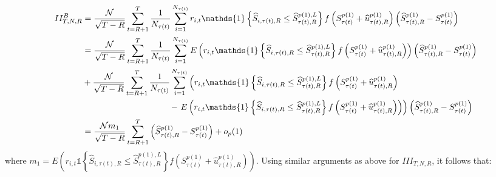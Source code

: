 \begin{align*}
    II_{T,N,R}^B &= \frac{\mathcal{N}}{\sqrt{T-R}}\sum_{t=R+1}^{T} \frac{1}{N_{\tau(t)}}\sum_{i=1}^{N_{\tau(t)}} r_{i,t} \mathds{1} \left\{ \widehat{S}_{i,\tau(t),R}\leq \widehat{S}_{\tau(t),R}^{p(1),L}\right\} f \left( S_{\tau(t)}^{p(1)}+\widehat{u}_{\tau(t),R}^{p(1)} \right) \left( \widehat{S}_{\tau(t),R}^{p(1)} - S_{\tau(t)}^{p(1)} \right)\\
    &= \frac{\mathcal{N}}{\sqrt{T-R}}\sum_{t=R+1}^{T} \frac{1}{N_{\tau(t)}}\sum_{i=1}^{N_{\tau(t)}} E \left( r_{i,t} \mathds{1} \left\{ \widehat{S}_{i,\tau(t),R}\leq \widehat{S}_{\tau(t),R}^{p(1),L}\right\} f \left( S_{\tau(t)}^{p(1)}+\widehat{u}_{\tau(t),R}^{p(1)} \right) \right) \left( \widehat{S}_{\tau(t),R}^{p(1)} - S_{\tau(t)}^{p(1)} \right) \\
    &+ \frac{\mathcal{N}}{\sqrt{T-R}}\sum_{t=R+1}^{T} \frac{1}{N_{\tau(t)}}\sum_{i=1}^{N_{\tau(t)}} \left( r_{i,t} \mathds{1} \left\{ \widehat{S}_{i,\tau(t),R}\leq \widehat{S}_{\tau(t),R}^{p(1),L}\right\} f \left( S_{\tau(t)}^{p(1)}+\widehat{u}_{\tau(t),R}^{p(1)} \right) \right. \\
    &\hspace{3.6cm}- \left. E \left( r_{i,t} \mathds{1} \left\{ \widehat{S}_{i,\tau(t),R}\leq \widehat{S}_{\tau(t),R}^{p(1),L}\right\} f \left( S_{\tau(t)}^{p(1)}+\widehat{u}_{\tau(t),R}^{p(1)} \right) \right) \right) \left( \widehat{S}_{\tau(t),R}^{p(1)} - S_{\tau(t)}^{p(1)} \right) \\
    &= \frac{\mathcal{N}m_{1}}{\sqrt{T-R}}\sum_{t=R+1}^{T}\left( \widehat{S}_{\tau(t),R}^{p(1)}-S_{\tau(t)}^{p(1)}\right) + o_p(1)
\end{align*}
where $m_1 = E \left( r_{i,t} \mathds{1} \left\{ \widehat{S}_{i,\tau(t),R}\leq \widehat{S}_{\tau(t),R}^{p(1),L}\right\} f \left( S_{\tau(t)}^{p(1)}+\widehat{u}_{\tau(t),R}^{p(1)} \right) \right)$.
Using similar arguments as above for $III_{T,N,R}$, it follows that:
